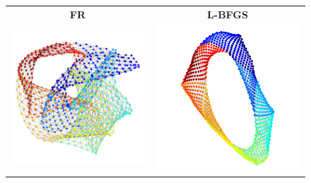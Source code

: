 \documentclass[dvipdfmx,journal]{IEEEtran}
\begin{document}
\begin{figure}[t]
    \centering
    \begin{tabular}{cc}
        \large{\textbf{\textsf{FR}}}                                       & \large{\textbf{\textsf{L-BFGS}}}   \\
        \begin{minipage}{0.45\columnwidth}
            \centering
            \includegraphics[width=0.85\columnwidth]{jagmesh1/jagmesh1_FR.png}
        \end{minipage} &
        \begin{minipage}{0.45\columnwidth}
            \centering
            \includegraphics[width=0.85\columnwidth]{jagmesh1/jagmesh1_L_BFGS.png}

\end{minipage}
\end{tabular}
\end{figure}
\end{document}
